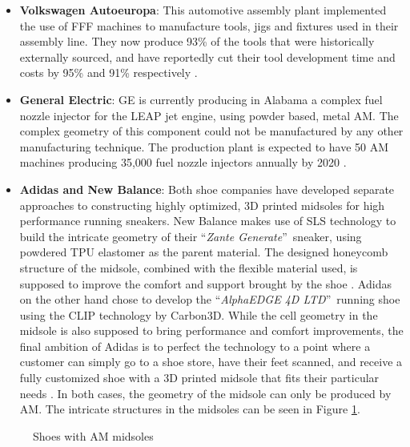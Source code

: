\documentclass[main.tex]{subfiles}
\begin{document}
\begin{itemize}
	\item \textbf{Volkswagen Autoeuropa}: This automotive assembly plant implemented the use of FFF machines to manufacture tools, jigs and fixtures used in their assembly line. They now produce 93\% of the tools that were historically externally sourced, and have reportedly cut their tool development time and costs by 95\% and 91\% respectively \cite{deVries2017}.
	\item \textbf{General Electric}: GE is currently producing in Alabama a complex fuel nozzle injector for the LEAP jet engine, using powder based, metal AM. The complex geometry of this component could not be manufactured by any other manufacturing technique. The production plant is expected to have 50 AM machines producing 35,000 fuel nozzle injectors annually by 2020 \cite{GEAdditive2016}. 
	\item \textbf{Adidas and New Balance}: Both shoe companies have developed separate approaches to constructing highly optimized, 3D printed midsoles for high performance running sneakers. New Balance makes use of SLS technology to build the intricate geometry of their \textquotedblleft \emph{Zante Generate}\textquotedblright~sneaker, using powdered TPU elastomer as the parent material. The designed honeycomb structure of the midsole, combined with the flexible material used, is supposed to improve the comfort and support brought by the shoe \cite{NewBalance2016}. Adidas on the other hand chose to develop the \textquotedblleft \emph{AlphaEDGE 4D LTD}\textquotedblright~running shoe using the CLIP technology by Carbon3D. While the cell geometry in  the midsole is also supposed to bring performance and comfort improvements, the final ambition of Adidas is to perfect the technology to a point where a customer can simply go to a shoe store, have their feet scanned, and receive a fully customized shoe with a 3D printed midsole that fits their particular needs \cite{Matisons2015,Saunders2018}. In both cases, the geometry of the midsole can only be produced by AM. The intricate structures in the midsoles can be seen in Figure \ref{fig:AMshoes}.
		
\end{itemize}
\begin{figure}[h]
	\center
	\hfill
	\caption{Shoes with AM midsoles}
	\label{fig:AMshoes}
\end{figure}
\end{document}
